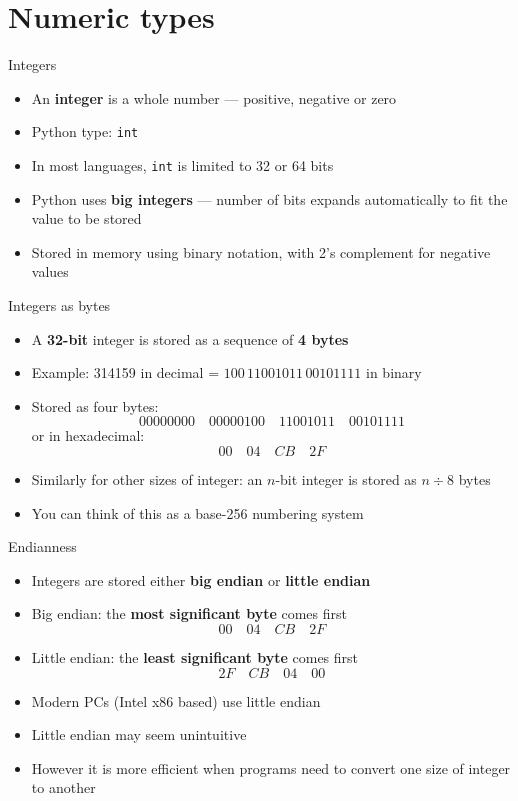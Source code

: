 \part{Numeric types}
\frame{\partpage}

\begin{frame}{Integers}
	\begin{itemize}
		\pause\item An \textbf{integer} is a whole number --- positive, negative or zero
		\pause\item Python type: \lstinline{int}
		\pause\item In most languages, \lstinline{int} is limited to 32 or 64 bits
		\pause\item Python uses \textbf{big integers} --- number of bits expands automatically to fit the value to be stored
		\pause\item Stored in memory using binary notation, with 2's complement for negative values
	\end{itemize}
\end{frame}

\begin{frame}{Integers as bytes}
	\begin{itemize}
		\pause\item A \textbf{32-bit} integer is stored as a sequence of \textbf{4 bytes}
		\pause\item Example: 314159 in decimal = $100\,11001011\,00101111$ in binary
		\pause\item Stored as four bytes:
		    $$
		        00000000 \quad
		        00000100 \quad
		        11001011 \quad
		        00101111
            $$
            or in hexadecimal:
            $$
		        00 \quad
		        04 \quad
		        CB \quad
		        2F
		    $$
		\pause\item Similarly for other sizes of integer:
		    an $n$-bit integer is stored as $n \div 8$ bytes
		\pause\item You can think of this as a base-256 numbering system
	\end{itemize}
\end{frame}

\begin{frame}{Endianness}
	\begin{itemize}
		\pause\item Integers are stored either \textbf{big endian} or \textbf{little endian}
		\pause\item Big endian: the \textbf{most significant byte} comes first
            $$
		        00 \quad
		        04 \quad
		        CB \quad
		        2F
		    $$
		\pause\item Little endian: the \textbf{least significant byte} comes first
            $$
		        2F \quad
		        CB \quad
		        04 \quad
		        00
		    $$
		\pause\item Modern PCs (Intel x86 based) use little endian
		\pause\item Little endian may seem unintuitive
		\pause\item However it is more efficient when programs need to convert one size of integer to another
	\end{itemize}
\end{frame}

